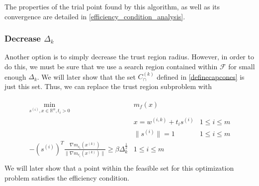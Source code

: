 \documentclass{article}
\newenvironment{comment}
  {\par\medskip
   \color{red}%
   \begin{framed}
   \textbf{Comment: }\ignorespaces}
 {\end{framed}
  \medskip}
\theoremstyle{case}
\newcommand{\xk}{{x^{(k)}}}
\newcommand{\Rn}{\mathbb R^n}
\newcommand{\reals}{\mathbb R}
\newcommand{\dk}{\Delta_k}
\newcommand{\mfk}{{{m}_f}^{(k)}}
\newcommand{\mcik}{{{m}_{c_i}}^{(k)}}
\newcommand{\feasible}{{\mathcal F}}
\newcommand{\wik}{{w^{(i, k)}}}
\newcommand{\trsinfset}{{E_\text{infeasible}}}
\newcommand{\trstol}{{\delta_\text{infeasible}}}
\newcommand{\hgik}{{\frac{\nabla m_{c_i}(\xk)}{\|\nabla m_{c_i}(\xk)\|}}}
\newcommand{\capcones}{{C^{(k)}_{\cap}}}
\begin{document}
The properties of the trial point found by this algorithm, as well as its convergence are detailed in \cref{efficiency_condition_analysis}.



\subsubsection{Decrease $\dk$}

Another option is to simply decrease the trust region radius.
However, in order to do this, we must be sure that we use a search region contained within $\feasible$ for small enough $\dk$.
We will later show that the set $\capcones$ defined in \cref{definecapcones} is just this set.
Thus, we can replace the trust region subproblem with

\begin{align*}
\begin{array}{ccc}
\min_{s^{(i)},x\in\Rn,t_i>0} & m_f(x) & \\
 & x = \wik + t _i s^{(i)} & 1 \le i \le m \\
 & \|s^{(i)}\| = 1 & 1 \le i \le m \\
 -\left(s^{(i)}\right)^T\hgik \ge \beta \dk^{\frac 1 2 } & 1 \le i \le m \\
\end{array}
\end{align*}
We will later show that a point within the feasible set for this optimization problem satisfies the efficiency condition.


% 
% 
% 
% 
% 
% 
\end{document}
